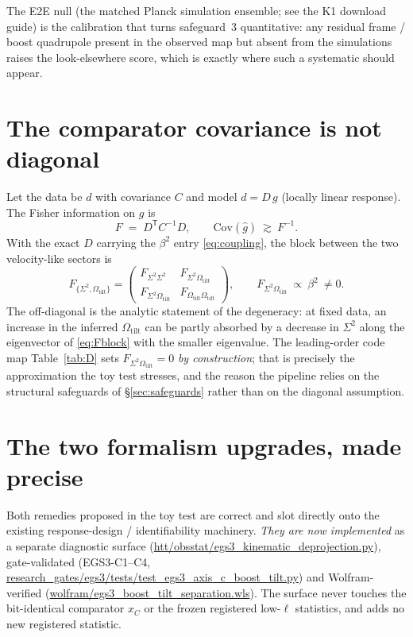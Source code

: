 \documentclass[11pt]{article}
\newcommand{\pathx}[1]{{\small\urlstyle{tt}\url{#1}}}  %
\newcommand{\Sig}{\Sigma^2}
\newcommand{\Otilt}{\Omega_{\mathrm{tilt}}}
\newcommand{\Cov}{\mathrm{Cov}}
\begin{document}
The E2E null (the matched Planck simulation ensemble; see the K1 download guide)
is the calibration that turns safeguard~3 quantitative: any residual frame /
boost quadrupole present in the observed map but absent from the simulations
raises the look-elsewhere score, which is exactly where such a systematic should
appear.

\section{The comparator covariance is not diagonal}
\label{sec:fisher}

Let the data be $d$ with covariance $C$ and model $d=D\,g$ (locally linear
response). The Fisher information on $g$ is
\begin{equation}
  F \;=\; D^{\mathsf T} C^{-1} D ,
  \qquad
  \Cov(\hat g)\ \gtrsim\ F^{-1}.
\end{equation}
With the exact $D$ carrying the $\beta^2$ entry \eqref{eq:coupling}, the block
between the two velocity-like sectors is
\begin{equation}
  F_{\{\Sig,\Otilt\}}
  =
  \begin{pmatrix}
    F_{\Sig\Sig} & F_{\Sig\Otilt}\\[2pt]
    F_{\Sig\Otilt} & F_{\Otilt\Otilt}
  \end{pmatrix},
  \qquad
  F_{\Sig\Otilt}\ \propto\ \beta^2\ \neq 0 .
  \label{eq:Fblock}
\end{equation}
The off-diagonal is the analytic statement of the degeneracy: at fixed data, an
increase in the inferred $\Otilt$ can be partly absorbed by a decrease in $\Sig$
along the eigenvector of \eqref{eq:Fblock} with the smaller eigenvalue. The
leading-order code map Table~\ref{tab:D} sets $F_{\Sig\Otilt}=0$ \emph{by
construction}; that is precisely the approximation the toy test stresses, and the
reason the pipeline relies on the structural safeguards of \S\ref{sec:safeguards}
rather than on the diagonal assumption.

\section{The two formalism upgrades, made precise}
\label{sec:tweaks}

Both remedies proposed in the toy test are correct and slot directly onto the
existing response-design / identifiability machinery. \emph{They are now
implemented} as a separate diagnostic surface
(\pathx{htt/obsstat/egs3_kinematic_deprojection.py}), gate-validated
(EGS3-C1--C4, \pathx{research_gates/egs3/tests/test_egs3_axis_c_boost_tilt.py})
and Wolfram-verified (\pathx{wolfram/egs3_boost_tilt_separation.wls}). The surface
never touches the bit-identical comparator $x_C$ or the frozen registered
low-$\ell$ statistics, and adds no new registered statistic.
\end{document}
